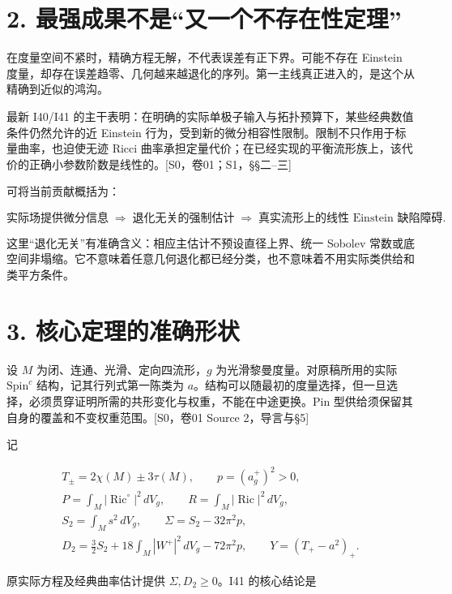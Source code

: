 \documentclass[UTF8,a4paper,11pt,fontset=fandol]{ctexart}
\begin{document}
\section{2.
最强成果不是``又一个不存在性定理''}\label{ux6700ux5f3aux6210ux679cux4e0dux662fux53c8ux4e00ux4e2aux4e0dux5b58ux5728ux6027ux5b9aux7406}

在度量空间不紧时，精确方程无解，不代表误差有正下界。可能不存在 Einstein
度量，却存在误差趋零、几何越来越退化的序列。第一主线真正进入的，是这个从精确到近似的鸿沟。

最新 I40/I41
的主干表明：在明确的实际单极子输入与拓扑预算下，某些经典数值条件仍然允许的近
Einstein
行为，受到新的微分相容性限制。限制不只作用于标量曲率，也迫使无迹 Ricci
曲率承担定量代价；在已经实现的平衡流形族上，该代价的正确小参数阶数是线性的。{[}S0，卷01；S1，§§二--三{]}

可将当前贡献概括为：

\[
\boxed{\text{实际场提供微分信息}
\;\Longrightarrow\;
\text{退化无关的强制估计}
\;\Longrightarrow\;
\text{真实流形上的线性 Einstein 缺陷障碍}.}
\]

这里``退化无关''有准确含义：相应主估计不预设直径上界、统一 Sobolev
常数或底空间非塌缩。它不意味着任意几何退化都已经分类，也不意味着不用实际类供给和类平方条件。

\section{3.
核心定理的准确形状}\label{ux6838ux5fc3ux5b9aux7406ux7684ux51c6ux786eux5f62ux72b6}

设 \(M\) 为闭、连通、光滑、定向四流形，\(g\)
为光滑黎曼度量。对原稿所用的实际 \(\mathrm{Spin}^c\)
结构，记其行列式第一陈类为
\(a\)。结构可以随最初的度量选择，但一旦选择，必须贯穿证明所需的共形变化与权重，不能在中途更换。Pin
型供给须保留其自身的覆盖和不变权重范围。{[}S0，卷01 Source
2，导言与§5{]}

记

\[
\begin{gathered}
T_\pm=2\chi(M)\pm3\tau(M),\qquad p=(a_g^+)^2>0,\\
P=\int_M|\operatorname{Ric}^{\circ}|^2\,dV_g,
\qquad R=\int_M|\operatorname{Ric}|^2\,dV_g,\\
S_2=\int_Ms^2\,dV_g,\qquad
\Sigma=S_2-32\pi^2p,\\
D_2=\frac32S_2+18\int_M|W^+|^2\,dV_g-72\pi^2p,
\qquad Y=(T_+-a^2)_+.
\end{gathered}
\]

原实际方程及经典曲率估计提供 \(\Sigma,D_2\ge0\)。I41 的核心结论是
\end{document}
